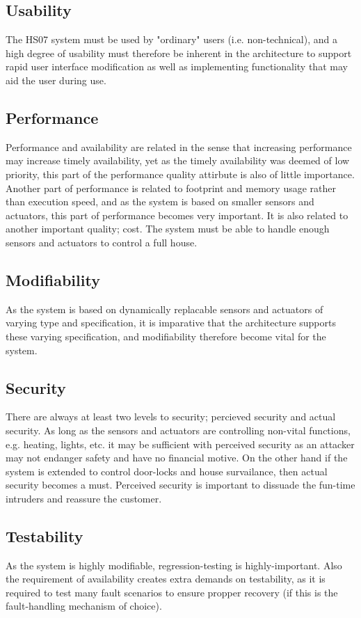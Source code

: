 \documentclass[a4paper,10pt]{article}
\begin{document}
\subsection{Usability}
The HS07 system must be used by "ordinary" users (i.e. non-technical), and a high degree of usability must therefore be inherent in the architecture to support rapid user interface modification as well as implementing functionality that may aid the user during use.
\subsection{Performance}
Performance and availability are related in the sense that increasing performance may increase timely availability, yet as the timely availability was deemed of low priority, this part of the performance quality attirbute is also of little importance.
Another part of performance is related to footprint and memory usage rather than execution speed, and as the system is based on smaller sensors and actuators, this part of performance becomes very important. It is also related to another important quality; cost.
The system must be able to handle enough sensors and actuators to control a full house.
\subsection{Modifiability}
As the system is based on dynamically replacable sensors and actuators of varying type and specification, it is imparative that the architecture supports these varying specification, and modifiability therefore become vital for the system.
\subsection{Security}
There are always at least two levels to security; percieved security and actual security. As long as the sensors and actuators are controlling non-vital functions, e.g. heating, lights, etc. it may be sufficient with perceived security as an attacker may not endanger safety and have no financial motive. On the other hand if the system is extended to control door-locks and house survailance, then actual security becomes a must. Perceived security is important to dissuade the fun-time intruders and reassure the customer.
\subsection{Testability}
As the system is highly modifiable, regression-testing is highly-important. Also the requirement of availability creates extra demands on testability, as it is required to test many fault scenarios to ensure propper recovery (if this is the fault-handling mechanism of choice).
\end{document}

